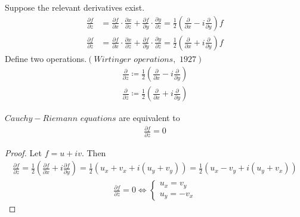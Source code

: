 	\vspace{2em}
	Suppose the relevant derivatives exist.
	\begin{align}
		\frac{\partial f}{\partial z} &= \frac{\partial f}{\partial x} \cdot \frac{\partial x}{\partial z} + \frac{\partial f}{\partial y} \cdot \frac{\partial y}{\partial z} = \frac{1}{2} \left( \frac{\partial}{\partial x} - i \frac{\partial}{\partial y} \right) f \\
		\frac{\partial f}{\partial \overline{z}} &= \frac{\partial f}{\partial x} \cdot \frac{\partial x}{\partial \overline{z}} + \frac{\partial f}{\partial y} \cdot \frac{\partial y}{\partial \overline{z}} = \frac{1}{2} \left( \frac{\partial}{\partial x} + i \frac{\partial}{\partial y} \right) f
	\end{align}
	Define two operations.$\left( Wirtinger \,\, operations , \,\, 1927 \right)$
	\begin{align}
		\frac{\partial}{\partial z} \coloneqq \frac{1}{2} \left( \frac{\partial}{\partial x} - i \frac{\partial}{\partial y} \right) \\
		\frac{\partial}{\partial \overline{z}} \coloneqq \frac{1}{2} \left( \frac{\partial}{\partial x} + i \frac{\partial}{\partial y} \right)
	\end{align}

	\vspace{2em}
	\begin{proposition}\label{prop 2.5.1}
		$Cauchy - Riemann \,\, equations$ are equivalent to
		\begin{align}
			\frac{\partial f}{\partial \overline{z}} = 0
		\end{align}
	
		\vspace{2em}
		\begin{proof}
			Let $f = u + i v$. Then 
			\begin{align}
				\frac{\partial f}{\partial \overline{z}} = \frac{1}{2} \left( \frac{\partial f}{\partial x} + i \frac{\partial f}{\partial y} \right) = \frac{1}{2} \left( u_x + v_x + i (u_y + v_y) \right) = \frac{1}{2} \left( u_x - v_y + i (u_y + v_x) \right)
			\end{align}
			\begin{align}
				\frac{\partial f}{\partial \overline{z}} = 0 \Leftrightarrow 
				\begin{cases}
					u_x = v_y \\
					u_y = - v_x
				\end{cases}
			\end{align}
		\end{proof}
	\end{proposition}

